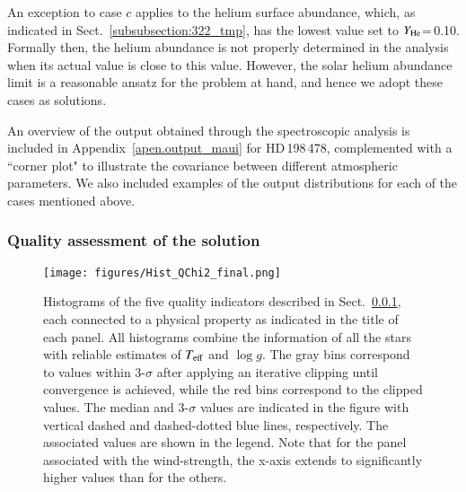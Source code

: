 \documentclass{aa}
\newcommand{\Teff}{\mbox{$T_{\rm eff}$}\xspace}
\newcommand{\logg}{\mbox{$\log g$}\xspace}
\newcommand{\He}{$Y_{\rm He}$\xspace}
\begin{document}
An exception to case $c$ applies to the helium surface abundance, which, as indicated in Sect.~\ref{subsubsection:322_tmp}, has the lowest value set to \He=\,0.10. Formally then, the helium abundance is not properly determined in the analysis when its actual value is close to this value. However, the solar helium abundance limit is a reasonable ansatz for the problem at hand, and hence we adopt these cases as solutions.  

An overview of the output obtained through the spectroscopic analysis is included in Appendix~\ref{apen.output_maui} for HD\,198\,478, complemented with a  ``corner plot" to illustrate the covariance between different atmospheric parameters. We also included examples of the output distributions for each of the cases mentioned above. 


\subsubsection{Quality assessment of the solution}
\label{subsubsection:325_tmp}

\begin{figure*}[t!]
\centering
\texttt{[image: figures/Hist\_QChi2\_final.png]}
\caption{Histograms of the five quality indicators described in Sect.~\ref{subsubsection:325_tmp}, each connected to a physical property as indicated in the title of each panel. All histograms combine the information of all the stars with reliable estimates of \Teff and \logg. The gray bins correspond to values within 3-$\sigma$ after applying an iterative clipping until convergence is achieved, while the red bins correspond to the clipped values. The median and 3-$\sigma$ values are indicated in the figure with vertical dashed and dashed-dotted blue lines, respectively. The associated values are shown in the legend. Note that for the panel associated with the wind-strength, the x-axis extends to significantly higher values than for the others.}
\label{fig:chi2_quality}
\end{figure*}
\end{document}
